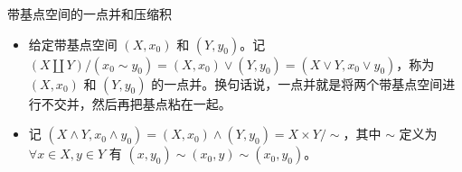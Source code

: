 \begin{definition}{带基点空间的一点并和压缩积}\label{def_Topo9_1}
\begin{itemize}
\item 给定带基点空间 $(X, x_0)$ 和 $(Y, y_0)$。记 $(X\amalg Y)/(x_0\sim y_0)=(X, x_0)\vee(Y, y_0)=(X\vee Y, x_0\vee y_0)$，称为 $(X, x_0)$ 和 $(Y, y_0)$ 的一点并。换句话说，一点并就是将两个带基点空间进行不交并，然后再把基点粘在一起。

\item 记 $(X\land Y, x_0\land y_0)=(X, x_0)\land(Y, y_0)=X\times Y/\sim$，其中 $\sim$ 定义为 $\forall x\in X, y\in Y$ 有 $ (x, y_0)\sim(x_0, y)\sim(x_0, y_0)$。

\end{itemize}
\end{definition}
